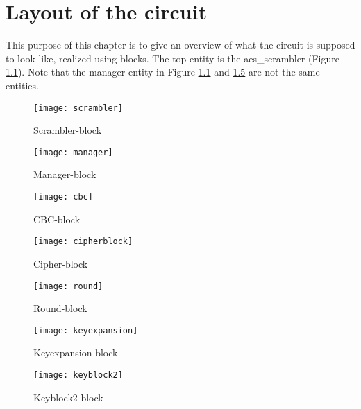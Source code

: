 \chapter{Layout of the circuit} \label{app:blocks}
This purpose of this chapter is to give an overview of what the circuit is 
supposed to look like, realized using blocks. The top entity is the 
aes\_scrambler (Figure \ref{block:scrambler}). Note that the manager-entity in Figure \ref{block:scrambler} and 
\ref{block:round} are not the same entities.

\begin{figure}
  \texttt{[image: scrambler]}
  \caption{Scrambler-block}
  \label{block:scrambler}
\end{figure}

\begin{figure}
  \texttt{[image: manager]}
  \caption{Manager-block}
  \label{block:manager}
\end{figure}

\begin{figure}
  \texttt{[image: cbc]}
  \caption{CBC-block}
  \label{block:cbc}
\end{figure}

\begin{figure}
  \texttt{[image: cipherblock]}
  \caption{Cipher-block}
  \label{block:cipher}
\end{figure}

\begin{figure}
  \texttt{[image: round]}
  \caption{Round-block}
  \label{block:round}
\end{figure}

\begin{figure}
  \texttt{[image: keyexpansion]}
  \caption{Keyexpansion-block}
  \label{block:keyexpansion}
\end{figure}

\begin{figure}
  \texttt{[image: keyblock2]}
  \caption{Keyblock2-block}
  \label{block:keyblock2}
\end{figure}
